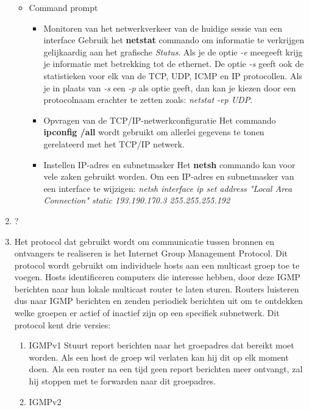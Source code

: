 \documentclass{report}
\begin{document}
\begin{enumerate}
\begin{itemize}
\begin{itemize}
			\end{itemize}
		\item Command prompt
		\begin{itemize}
			\item Monitoren van het netwerkverkeer van de huidige sessie van een interface
			\newline
			Gebruik het \textbf{netstat} commando om informatie te verkrijgen gelijkaardig aan het grafische \textit{Status}. Als je de optie \textit{-e} meegeeft krijg je informatie met betrekking tot de ethernet. De optie \textit{-s} geeft ook de statistieken voor elk van de TCP, UDP, ICMP en IP protocollen. Als je in plaats van \textit{-s} een \textit{-p} als optie geeft, dan kan je kiezen door een protocolnaam erachter te zetten zoals: \textit{netstat -ep UDP}.
			\item Opvragen van de TCP/IP-netwerkconfiguratie
			\newline
			Het commando \textbf{ipconfig /all} wordt gebruikt om allerlei gegevens te tonen gerelateerd met het TCP/IP netwerk.
			\item Instellen IP-adres en subnetmasker
			Het \textbf{netsh} commando kan voor vele zaken gebruikt worden. Om een IP-adres en subnetmasker van een interface te wijzigen: \textit{netsh interface ip set address "Local Area Connection" static 193.190.170.3 255.255.255.192}
		\end{itemize}
	\end{itemize}
	\item ?
	\item Het protocol dat gebruikt wordt om communicatie tussen bronnen en ontvangers te realiseren is het Internet Group Management Protocol. Dit protocol wordt gebruikt om individuele hosts aan een multicast groep toe te voegen. Hosts identificeren computers die interesse hebben, door deze IGMP berichten naar hun lokale multicast router te laten sturen. Routers luisteren dus naar IGMP berichten en zenden periodiek berichten uit om te ontdekken welke groepen er actief of inactief zijn op een specifiek subnetwerk. Dit protocol kent drie versies:
	\begin{enumerate}
		\item IGMPv1
		\newline
		Stuurt report berichten naar het groepadres dat bereikt moet worden. Als een host de groep wil verlaten kan hij dit op elk moment doen. Als een router na een tijd geen report berichten meer ontvangt, zal hij stoppen met te forwarden naar dit groepadres.
		\item IGMPv2

\end{enumerate}
\end{enumerate}
\end{document}
